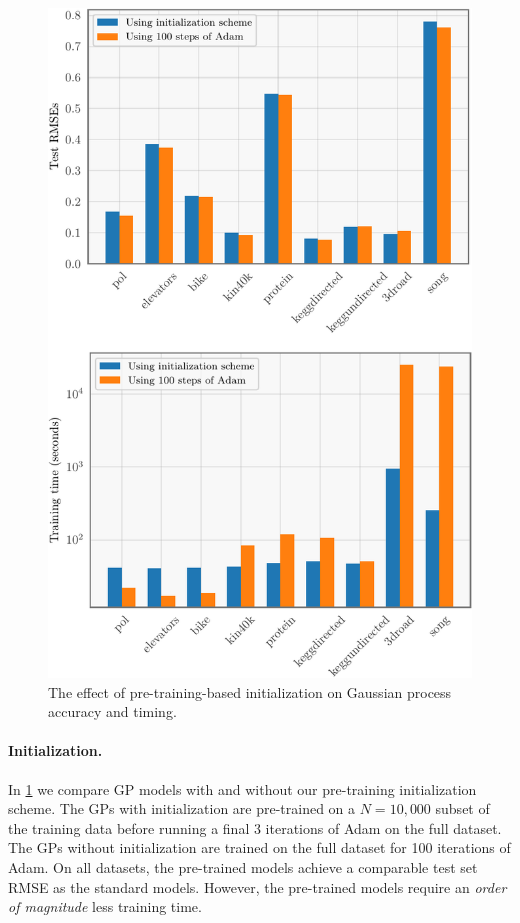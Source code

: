\begin{figure}[t!]
  \centering
  \includegraphics[width=0.75\linewidth]{figures/initialization.pdf}
  \caption[
    The effect of pre-training-based initialization on Gaussian process accuracy and timing.
  ]{
    The effect of pre-training-based initialization on Gaussian process accuracy and timing.
  }
  \label{fig:initialization}
\end{figure}

\paragraph{Initialization.}
In \cref{fig:initialization} we compare GP models with and without our pre-training initialization scheme.
The GPs with initialization are pre-trained on a $N=10,\!000$ subset of the training data before running a final $3$ iterations of Adam on the full dataset.
The GPs without initialization are trained on the full dataset for 100 iterations of Adam.
On all datasets, the pre-trained models achieve a comparable test set RMSE as the standard models.
However, the pre-trained models require an \emph{order of magnitude} less training time.

